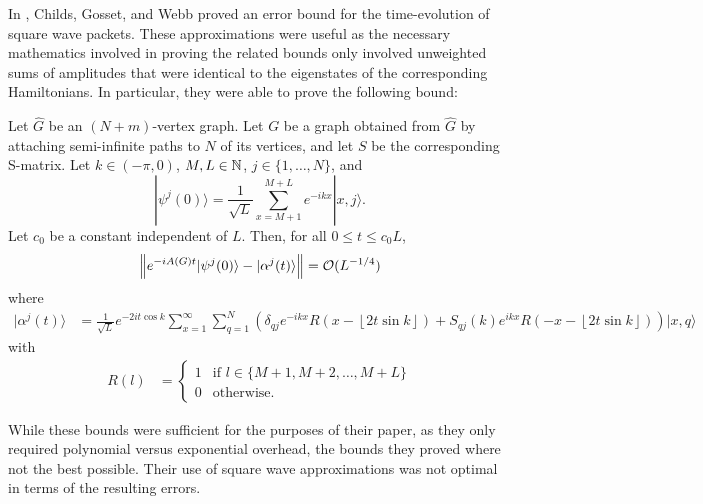 \documentclass[../thesis-main/thesis-main]{subfiles}
\begin{document}
In \cite{MPQW}, Childs, Gosset, and Webb proved an error bound for the time-evolution of square wave packets.  These approximations were useful as the necessary mathematics involved in proving the related bounds only involved unweighted sums of amplitudes that were identical to the eigenstates of the corresponding Hamiltonians.  In particular, they were able to prove the following bound:
\begin{theorem}
Let $\widehat{G}$ be an $(N+m)$-vertex graph. Let $G$ be a graph obtained from $\widehat{G}$ by attaching semi-infinite paths to $N$ of its vertices, and let $S$ be the corresponding S-matrix.  Let $k\in(-\pi,0)$, $M,L\in\mathbb{N}$, $j\in\{1,\ldots,N\}$, and
\begin{equation}
  |\psi^{j}(0)\rangle=\frac{1}{\sqrt{L}}\sum_{x=M+1}^{M+L}e^{-ikx}|x,j\rangle.
\end{equation}
Let $c_{0}$ be a constant independent of $L$. Then, for all $0\leq t\leq c_{0}L$,
\begin{equation}
  \left\Vert e^{-iA(G) t}|\psi^{j}(0)\rangle-|\alpha^{j}(t)\rangle\right\Vert =\mathcal{O}(L^{-{1}/{4}})
\end{equation}
where 
\begin{align}
  |\alpha^{j}(t)\rangle & =  \frac{1}{\sqrt{L}}e^{-2it\cos k}\sum_{x=1}^{\infty}\sum_{q=1}^{N}\left(\delta_{qj} e^{-ikx}R(x-\left\lfloor 2t\sin k\right\rfloor)+S_{qj}(k)e^{ikx}R(-x-\left\lfloor 2t\sin k\right\rfloor)\right)|x,q\rangle
\end{align}
with
\begin{align}
R(l) & =  \begin{cases}
1 & \text{if }l\in\{M+1,M+2,\ldots,M+L\}\\
0 & \text{otherwise.}\end{cases}
\end{align}
\end{theorem}

While these bounds were sufficient for the purposes of their paper, as they only required polynomial versus exponential overhead, the bounds they proved where not the best possible.  Their use of square wave approximations was not optimal in terms of the resulting errors.  
\end{document}
